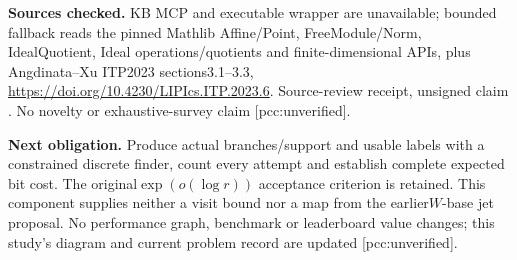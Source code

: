 \documentclass[11pt]{article}
\begin{document}
\textbf{Sources checked.} KB MCP and executable wrapper are unavailable;
bounded fallback reads the pinned Mathlib Affine/Point, FreeModule/Norm,
IdealQuotient, Ideal operations/quotients and finite-dimensional APIs, plus
Angdinata--Xu ITP2023 sections3.1--3.3,
\url{https://doi.org/10.4230/LIPIcs.ITP.2023.6}.
Source-review receipt, unsigned claim
. No novelty or exhaustive-survey claim
[pcc:unverified].

\textbf{Next obligation.} Produce actual branches/support and usable labels
with a constrained discrete finder, count every attempt and establish
complete expected bit cost. The original$\exp(o(\log r))$ acceptance criterion
is retained. This component supplies neither a visit bound nor a map from
the earlier$W$-base jet proposal. No performance graph, benchmark or leaderboard
value changes; this study's diagram and current problem record are updated
[pcc:unverified].
\end{document}
